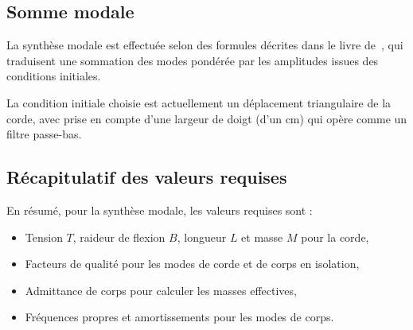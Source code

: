 \subsection{Somme modale}

  La synthèse modale est effectuée selon des formules décrites
dans le livre de~\textcite{newland}, qui traduisent une sommation des modes
pondérée par les amplitudes issues des conditions initiales.

  La condition initiale choisie est actuellement un déplacement triangulaire
de la corde, avec prise en compte d'une largeur de doigt (d'un \( \si{\cm} \))
qui opère comme un filtre passe-bas.

\subsection{Récapitulatif des valeurs requises}

En résumé, pour la synthèse modale, les valeurs requises sont :
\begin{itemize}
 \item Tension \( T \), raideur de flexion \( B \), longueur \( L \) et
  masse \( M \) pour la corde,
 \item Facteurs de qualité pour les modes de corde et de corps en isolation,
 \item Admittance de corps pour calculer les masses effectives,
 \item Fréquences propres et amortissements pour les modes de corps.
\end{itemize}

\subsection{}

  
% 

